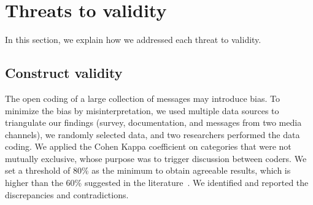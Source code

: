 \documentclass{sig-alternate-05-2015}
\begin{document}
\section{Threats to validity}
\label{cha:threats}


%

In this section, we explain how we addressed each threat to
validity.

\subsection{Construct validity}

The open coding of a large collection of messages may introduce bias.
To minimize the bias by misinterpretation, we used multiple data sources to triangulate our findings (survey, documentation, and messages from two media channels), we randomly selected data, and two researchers performed the data coding.
We applied the Cohen Kappa coefficient on categories that were not mutually exclusive, whose purpose  was to trigger discussion between coders.
We set a threshold of 80\% as the minimum to obtain agreeable results, which is higher than the 60\% suggested in the literature~\cite{Landis1977}.
We identified and reported the discrepancies and contradictions.
\end{document}
